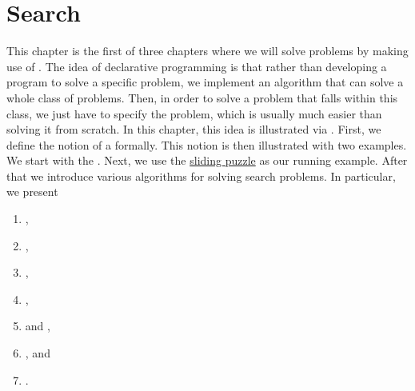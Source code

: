 \chapter{Search}
This chapter is the first of three chapters where we will solve problems by making use of
. 
The idea of declarative programming is that rather than developing a program to solve a specific problem,
we implement an algorithm that can solve a whole class of problems.  Then, in order to solve a problem that
falls within this class, we just have to specify the problem, which is usually much easier than solving it from
scratch.  In this chapter, this idea is illustrated via .
First, we define the notion of a  formally.  This notion is then illustrated with two
examples.  We start with the .  Next, we use the 
\href{https://en.wikipedia.org/wiki/15_puzzle}{sliding puzzle} as our running example. 
After that we introduce various algorithms for solving search problems.  In particular, we present
\begin{enumerate}
\item {},
\item {},
\item {},
\item {},
\item {} and ,
\item {}, and
\item {}.
\end{enumerate}

